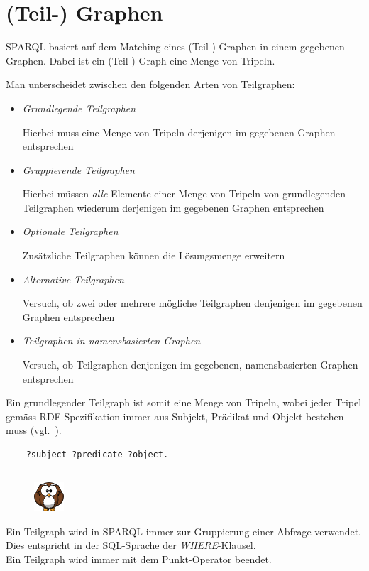 \section{(Teil-) Graphen}
\label{sec:sparql_graph}

SPARQL basiert auf dem Matching eines (Teil-) Graphen in einem gegebenen Graphen. Dabei ist ein (Teil-) Graph eine Menge von Tripeln.

Man unterscheidet zwischen den folgenden Arten von Teilgraphen:
\begin{itemize}
\item \textit{Grundlegende Teilgraphen}

Hierbei muss eine Menge von Tripeln derjenigen im gegebenen Graphen entsprechen

\item \textit{Gruppierende Teilgraphen}

Hierbei müssen \textit{alle} Elemente einer Menge von Tripeln von grundlegenden Teilgraphen wiederum derjenigen im gegebenen Graphen entsprechen

\item \textit{Optionale Teilgraphen}

Zusätzliche Teilgraphen können die Lösungsmenge erweitern

\item \textit{Alternative Teilgraphen}

Versuch, ob zwei oder mehrere mögliche Teilgraphen denjenigen im gegebenen Graphen entsprechen

\item \textit{Teilgraphen in namensbasierten Graphen}

Versuch, ob Teilgraphen denjenigen im gegebenen, namensbasierten Graphen entsprechen
\end{itemize}

Ein grundlegender Teilgraph ist somit eine Menge von Tripeln, wobei jeder Tripel gemäss RDF-Spezifikation immer aus Subjekt, Prädikat und Objekt bestehen muss (vgl.~\cite[3.1 Triples]{w3rdf}).

\begin{lstlisting}
    ?subject ?predicate ?object.
\end{lstlisting}

\noindent\rule[1ex]{\textwidth}{1pt}
\begin{figure}
    \vspace{-16pt}
    \includegraphics[width=0.1\textwidth]{bilder/owl.png}
\end{figure}
Ein Teilgraph wird in SPARQL immer zur Gruppierung einer Abfrage verwendet. Dies entspricht in der SQL-Sprache der \textit{WHERE}-Klausel.\\
Ein Teilgraph wird immer mit dem Punkt-Operator beendet.

